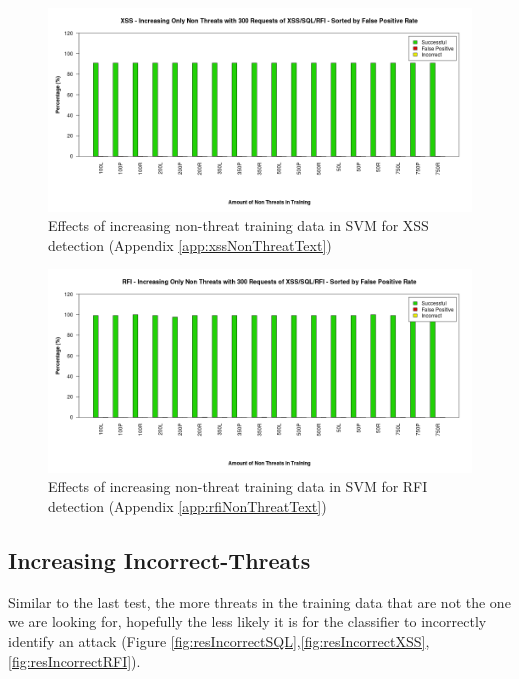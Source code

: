 \newpage
\begin{figure}[H]
	\centering
	\includegraphics[width=450px]{./assets/appendix/fullresults/svm/nonthreat/Results_XSS.png}
	\caption{Effects of increasing non-threat training data in SVM for XSS detection (Appendix \ref{app:xssNonThreatText})}
	\label{fig:resFalseXSS}
\end{figure}

\begin{figure}[H]
	\centering
	\includegraphics[width=450px]{./assets/appendix/fullresults/svm/nonthreat/Results_RFI.png}
	\caption{Effects of increasing non-threat training data in SVM for RFI detection (Appendix \ref{app:rfiNonThreatText})}
	\label{fig:resFalseRFI}
\end{figure}

\newpage
\subsection{Increasing Incorrect-Threats} \label{sec:resIncorrect}

Similar to the last test, the more threats in the training data that are not the one we are looking for, hopefully the less likely it is for the classifier to incorrectly identify an attack (Figure \ref{fig:resIncorrectSQL},\ref{fig:resIncorrectXSS},\ref{fig:resIncorrectRFI}).


